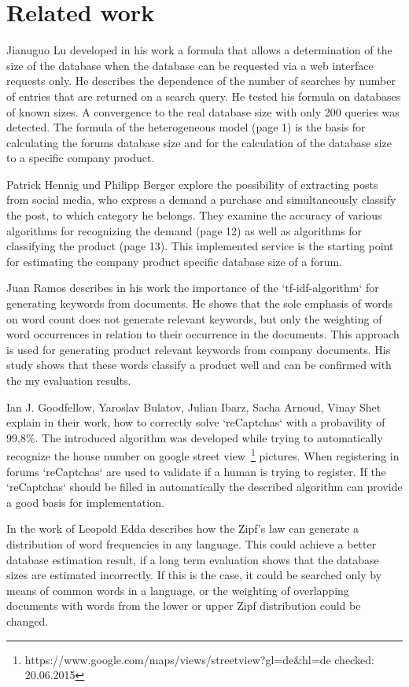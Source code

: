 \section{Related work}
Jianuguo Lu \cite{lu2008efficient} developed in his work a formula that allows a determination of the size of the database when the database can be requested via a web interface requests only. He describes the dependence of the number of searches by number of entries that are returned on a search query. He tested his formula on databases of known sizes. A convergence to the real database size with only 200 queries was detected. The formula of the heterogeneous model (page 1) is the basis for calculating the forums database size and for the calculation of the database size to a specific company product.

Patrick Hennig und Philipp Berger \cite{n2o} explore the possibility of extracting posts from social media, who express a demand a purchase and simultaneously classify the post, to which category he belongs. They examine the accuracy of various algorithms for recognizing the demand (page 12) as well as algorithms for classifying the product (page 13). This implemented service is the starting point for estimating the company product specific database size of a forum.

Juan Ramos \cite{ramos2003using} describes in his work the importance of the `tf-idf-algorithm` for generating keywords from documents. He shows that the sole emphasis of words on word count does not generate relevant keywords, but only the weighting of word occurrences in relation to their occurrence in the documents. This approach is used for generating product relevant keywords from company documents. His study shows that these words classify a product well and can be confirmed with the my evaluation results.

Ian J. Goodfellow, Yaroslav Bulatov, Julian Ibarz, Sacha Arnoud, Vinay Shet \cite{goodfellow2013multi} explain in their work, how to correctly solve `reCaptchas` with a probavility of 99,8\%. The introduced algorithm was developed while trying to automatically recognize the house number on google street view~\footnote{https://www.google.com/maps/views/streetview?gl=de\&hl=de checked: 20.06.2015} pictures. When registering in forums `reCaptchas` are used to validate if a human is trying to register. If the `reCaptchas` should be filled in automatically the described algorithm can provide a good basis for implementation.

In the work of Leopold Edda\cite{leopold2002zipfsche} describes how the Zipf's law can generate a distribution of word frequencies in any language.
This could achieve a better database estimation result, if  a long term evaluation shows that the database sizes are estimated incorrectly. If this is the case, it could be searched only by means of common words in a language, or the weighting of overlapping documents with words from the lower or upper Zipf distribution could be changed.

